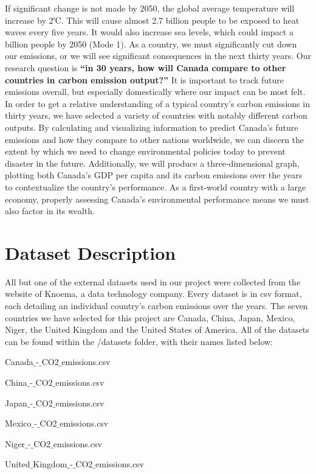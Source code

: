 \documentclass[fontsize=11pt]{article}
\begin{document}
    If significant change is not made by 2050, the global average temperature will increase by 2℃. This will cause almost 2.7 billion people to be exposed to heat waves every five years. It would also increase sea levels, which could impact a billion people by 2050 (Mode 1). As a country, we must significantly cut down our emissions, or we will see significant consequences in the next thirty years.
    Our research question is \textbf{“in 30 years, how will Canada compare to other countries in carbon emission output?”} It is important to track future emissions overall, but especially domestically where our impact can be most felt. In order to get a relative understanding of a typical country’s carbon emissions in thirty years, we have selected a variety of countries with notably different carbon outputs. By calculating and visualizing information to predict Canada’s future emissions and how they compare to other nations worldwide, we can discern the extent by which we need to change environmental policies today to prevent disaster in the future. Additionally, we will produce a three-dimensional graph, plotting both Canada's GDP per capita and its carbon emissions over the years to contextualize the country's performance. As a first-world country with a large economy, properly assessing Canada's environmental performance means we must also factor in its wealth.


    \section*{Dataset Description}

    All but one of the external datasets used in our project were collected from the website of Knoema, a data technology company. Every dataset is in csv format, each detailing an individual country’s carbon emissions over the years. The seven countries we have selected for this project are Canada, China, Japan, Mexico, Niger, the United Kingdom and the United States of America. All of the datasets can be found within the /datasets folder, with their names listed below:

    Canada$\_$-$\_$CO2$\_$emissions.csv

    China$\_$-$\_$CO2$\_$emissions.csv

    Japan$\_$-$\_$CO2$\_$emissions.csv

    Mexico$\_$-$\_$CO2$\_$emissions.csv

    Niger$\_$-$\_$CO2$\_$emissions.csv

    United$\_$Kingdom$\_$-$\_$CO2$\_$emissions.csv
\end{document}
